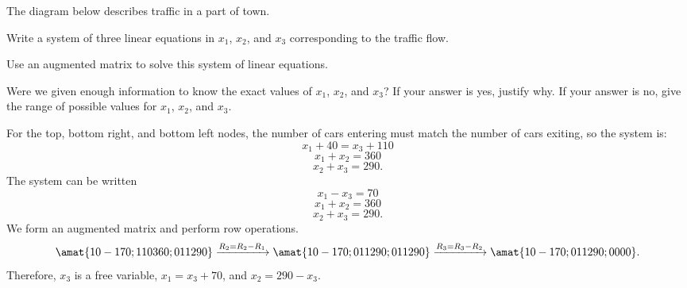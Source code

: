 \begin{problems}
\problem  %
The diagram below describes traffic in a part of town.
\begin{center}

\end{center}
\begin{subproblems}
\item Write a system of three linear equations in $x_1$, $x_2$, and
  $x_3$ corresponding to the traffic flow.
\item Use an augmented matrix to solve this system of linear equations.
\item Were we given enough information to know the exact 
  values of $x_1$, $x_2$, and $x_3$?  If your answer is yes, justify why.
  If your answer is no, give the range of possible values for $x_1$,
  $x_2$, and $x_3$.
\end{subproblems}


\begin{solution}
 \begin{subproblems}  
   \subproblem For the top, bottom right, and bottom left nodes, the
   number of cars entering must match the number of cars exiting, so
   the system is:
   \[x_1 + 40 = x_3 + 110\]
   \[x_1 + x_2 = 360\]
   \[x_2 + x_3 = 290.\] %
   \subproblem The system can be written
   \[x_1 - x_3 = 70\]
   \[x_1 + x_2 = 360\]
   \[x_2 + x_3 = 290.\] We form an augmented matrix and perform row
   operations.
   \[\amat{1 0 -1 70; 1 1 0 360; 0 1 1 290}
     \xrightarrow[]{R_2 = R_2 - R_1} \amat{1 0 -1 70; 0 1 1 290; 0 1 1
       290} \xrightarrow[]{R_3 = R_3 - R_2} \amat{1 0 -1 70; 0 1 1
       290; 0 0 0 0}.\] Therefore, $x_3$ is a free variable,
   $x_1 = x_3 + 70$, and $x_2 = 290-x_3$. \newline \newline


\end{subproblems}
\end{solution}
\end{problems}
